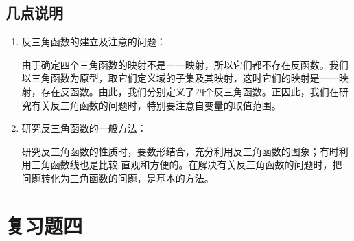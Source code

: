 











































































\subsection{几点说明}
\begin{enumerate}
\item 反三角函数的建立及注意的问题：

由于确定四个三角函数的映射不是一一映射，所以它们都不存在反函数。我们以三角函数为原型，取它们定义域的子集及其映射，这时它们的映射是一一映射，存在反函数。由此，我们分别定义了四个反三角函数。正因此，我们在研究有关反三角函数的问题时，特别要注意自变量的取值范围。
\item 研究反三角函数的一般方法：

研究反三角函数的性质时，要数形结合，充分利用反三角函数的图象；有时利用三角函数线也是比较 直观和方便的。在解决有关反三角函数的问题时，把问题转化为三角函数的问题，是基本的方法。
\end{enumerate}

\section*{复习题四}

